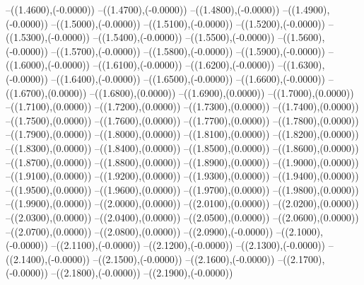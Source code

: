 {	--({\sx*(1.4600)},{\sy*(-0.0000)})
	--({\sx*(1.4700)},{\sy*(-0.0000)})
	--({\sx*(1.4800)},{\sy*(-0.0000)})
	--({\sx*(1.4900)},{\sy*(-0.0000)})
	--({\sx*(1.5000)},{\sy*(-0.0000)})
	--({\sx*(1.5100)},{\sy*(-0.0000)})
	--({\sx*(1.5200)},{\sy*(-0.0000)})
	--({\sx*(1.5300)},{\sy*(-0.0000)})
	--({\sx*(1.5400)},{\sy*(-0.0000)})
	--({\sx*(1.5500)},{\sy*(-0.0000)})
	--({\sx*(1.5600)},{\sy*(-0.0000)})
	--({\sx*(1.5700)},{\sy*(-0.0000)})
	--({\sx*(1.5800)},{\sy*(-0.0000)})
	--({\sx*(1.5900)},{\sy*(-0.0000)})
	--({\sx*(1.6000)},{\sy*(-0.0000)})
	--({\sx*(1.6100)},{\sy*(-0.0000)})
	--({\sx*(1.6200)},{\sy*(-0.0000)})
	--({\sx*(1.6300)},{\sy*(-0.0000)})
	--({\sx*(1.6400)},{\sy*(-0.0000)})
	--({\sx*(1.6500)},{\sy*(-0.0000)})
	--({\sx*(1.6600)},{\sy*(-0.0000)})
	--({\sx*(1.6700)},{\sy*(0.0000)})
	--({\sx*(1.6800)},{\sy*(0.0000)})
	--({\sx*(1.6900)},{\sy*(0.0000)})
	--({\sx*(1.7000)},{\sy*(0.0000)})
	--({\sx*(1.7100)},{\sy*(0.0000)})
	--({\sx*(1.7200)},{\sy*(0.0000)})
	--({\sx*(1.7300)},{\sy*(0.0000)})
	--({\sx*(1.7400)},{\sy*(0.0000)})
	--({\sx*(1.7500)},{\sy*(0.0000)})
	--({\sx*(1.7600)},{\sy*(0.0000)})
	--({\sx*(1.7700)},{\sy*(0.0000)})
	--({\sx*(1.7800)},{\sy*(0.0000)})
	--({\sx*(1.7900)},{\sy*(0.0000)})
	--({\sx*(1.8000)},{\sy*(0.0000)})
	--({\sx*(1.8100)},{\sy*(0.0000)})
	--({\sx*(1.8200)},{\sy*(0.0000)})
	--({\sx*(1.8300)},{\sy*(0.0000)})
	--({\sx*(1.8400)},{\sy*(0.0000)})
	--({\sx*(1.8500)},{\sy*(0.0000)})
	--({\sx*(1.8600)},{\sy*(0.0000)})
	--({\sx*(1.8700)},{\sy*(0.0000)})
	--({\sx*(1.8800)},{\sy*(0.0000)})
	--({\sx*(1.8900)},{\sy*(0.0000)})
	--({\sx*(1.9000)},{\sy*(0.0000)})
	--({\sx*(1.9100)},{\sy*(0.0000)})
	--({\sx*(1.9200)},{\sy*(0.0000)})
	--({\sx*(1.9300)},{\sy*(0.0000)})
	--({\sx*(1.9400)},{\sy*(0.0000)})
	--({\sx*(1.9500)},{\sy*(0.0000)})
	--({\sx*(1.9600)},{\sy*(0.0000)})
	--({\sx*(1.9700)},{\sy*(0.0000)})
	--({\sx*(1.9800)},{\sy*(0.0000)})
	--({\sx*(1.9900)},{\sy*(0.0000)})
	--({\sx*(2.0000)},{\sy*(0.0000)})
	--({\sx*(2.0100)},{\sy*(0.0000)})
	--({\sx*(2.0200)},{\sy*(0.0000)})
	--({\sx*(2.0300)},{\sy*(0.0000)})
	--({\sx*(2.0400)},{\sy*(0.0000)})
	--({\sx*(2.0500)},{\sy*(0.0000)})
	--({\sx*(2.0600)},{\sy*(0.0000)})
	--({\sx*(2.0700)},{\sy*(0.0000)})
	--({\sx*(2.0800)},{\sy*(0.0000)})
	--({\sx*(2.0900)},{\sy*(-0.0000)})
	--({\sx*(2.1000)},{\sy*(-0.0000)})
	--({\sx*(2.1100)},{\sy*(-0.0000)})
	--({\sx*(2.1200)},{\sy*(-0.0000)})
	--({\sx*(2.1300)},{\sy*(-0.0000)})
	--({\sx*(2.1400)},{\sy*(-0.0000)})
	--({\sx*(2.1500)},{\sy*(-0.0000)})
	--({\sx*(2.1600)},{\sy*(-0.0000)})
	--({\sx*(2.1700)},{\sy*(-0.0000)})
	--({\sx*(2.1800)},{\sy*(-0.0000)})
	--({\sx*(2.1900)},{\sy*(-0.0000)})
}
